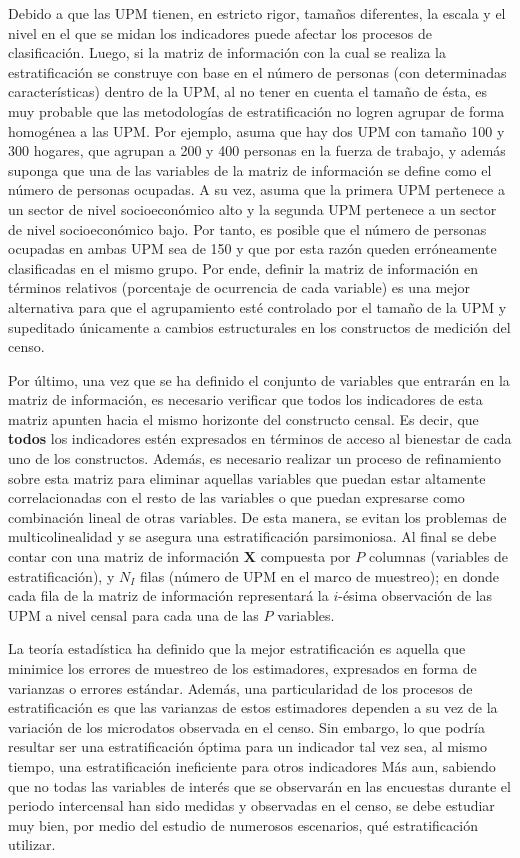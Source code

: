 \documentclass[
  12pt,
]{book}
\begin{document}
Debido a que las UPM tienen, en estricto rigor, tamaños diferentes, la escala y el nivel en el que se midan los indicadores puede afectar los procesos de clasificación. Luego, si la matriz de información con la cual se realiza la estratificación se construye con base en el número de personas (con determinadas características) dentro de la UPM, al no tener en cuenta el tamaño de ésta, es muy probable que las metodologías de estratificación no logren agrupar de forma homogénea a las UPM. Por ejemplo, asuma que hay dos UPM con tamaño 100 y 300 hogares, que agrupan a 200 y 400 personas en la fuerza de trabajo, y además suponga que una de las variables de la matriz de información se define como el número de personas ocupadas. A su vez, asuma que la primera UPM pertenece a un sector de nivel socioeconómico alto y la segunda UPM pertenece a un sector de nivel socioeconómico bajo. Por tanto, es posible que el número de personas ocupadas en ambas UPM sea de 150 y que por esta razón queden erróneamente clasificadas en el mismo grupo. Por ende, definir la matriz de información en términos relativos (porcentaje de ocurrencia de cada variable) es una mejor alternativa para que el agrupamiento esté controlado por el tamaño de la UPM y supeditado únicamente a cambios estructurales en los constructos de medición del censo.

Por último, una vez que se ha definido el conjunto de variables que entrarán en la matriz de información, es necesario verificar que todos los indicadores de esta matriz apunten hacia el mismo horizonte del constructo censal. Es decir, que \textbf{todos} los indicadores estén expresados en términos de acceso al bienestar de cada uno de los constructos. Además, es necesario realizar un proceso de refinamiento sobre esta matriz para eliminar aquellas variables que puedan estar altamente correlacionadas con el resto de las variables o que puedan expresarse como combinación lineal de otras variables. De esta manera, se evitan los problemas de multicolinealidad y se asegura una estratificación parsimoniosa. Al final se debe contar con una matriz de información \(\mathbf{X}\) compuesta por \(P\) columnas (variables de estratificación), y \(N_I\) filas (número de UPM en el marco de muestreo); en donde cada fila de la matriz de información representará la \(i\)-ésima observación de las UPM a nivel censal para cada una de las \(P\) variables.

La teoría estadística ha definido que la mejor estratificación es aquella que minimice los errores de muestreo de los estimadores, expresados en forma de varianzas o errores estándar. Además, una particularidad de los procesos de estratificación es que las varianzas de estos estimadores dependen a su vez de la variación de los microdatos observada en el censo. Sin embargo, lo que podría resultar ser una estratificación óptima para un indicador tal vez sea, al mismo tiempo, una estratificación ineficiente para otros indicadores Más aun, sabiendo que no todas las variables de interés que se observarán en las encuestas durante el periodo intercensal han sido medidas y observadas en el censo, se debe estudiar muy bien, por medio del estudio de numerosos escenarios, qué estratificación utilizar.
\end{document}
